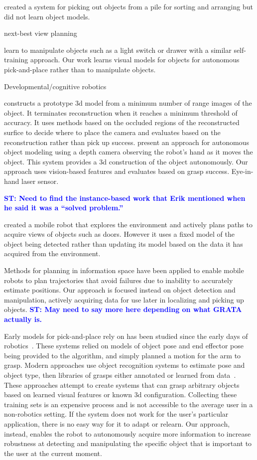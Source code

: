 \documentclass{article}
\newcommand{\stnote}[1]{\textcolor{blue}{\textbf{ST: #1}}}
\begin{document}
\citet{chang12} created a system for picking out objects from a pile
for sorting and arranging but did not learn object models.  

next-best view planning~\citep{kriegel11}

\citet{nguyen14} learn to manipulate objects such as a light switch or
drawer with a similar self-training approach.  Our work learns visual
models for objects for autonomous pick-and-place rather than to
manipulate objects.

Developmental/cognitive robotics~\citep{lyubova13, kraft10r}

\citet{banta00} constructs a prototype 3d model from a minimum number
of range images of the object.  It terminates reconstruction when it
reaches a minimum threshold of accuracy.  It uses methods based on the
occluded regions of the reconstructed surfice to decide where to place
the camera and evaluates based on the reconstruction rather than pick
up success.  \citet{krainin11} present an approach for autonomous
object modeling using a depth camera observing the robot's hand as it
moves the object.  This system provides a 3d construction of the
object autonomously.  Our approach uses vision-based features and
evaluates based on grasp success.  Eye-in-hand laser
sensor.~\citep{aeotti14}

\stnote{Need to find the instance-based work that Erik mentioned when
  he said it was a ``solved problem.''}

\citet{velez11} created a mobile robot that explores the environment
and actively plans paths to acquire views of objects such as doors.
However it uses a fixed model of the object being detected rather than
updating its model based on the data it has acquired from the
environment.

Methods for planning in information space \citep{he08, atanasov13,
  prentice09} have been applied to enable mobile robots to plan
trajectories that avoid failures due to inability to accurately
estimate positions.  Our approach is focused instead on
object detection and manipulation, actively acquiring data for use
later in localizing and picking up objects. \stnote{May need to say
  more here depending on what GRATA actually is.}


Early models for pick-and-place rely on has been studied since the
early days of robotics~\citep{brooks83, lozano89}.  These systems
relied on models of object pose and end effector pose being provided to the
algorithm, and simply planned a motion for the arm to grasp.  Modern
approaches use object recognition systems to estimate pose and object
type, then libraries of grasps either annotated or learned from
data~\citep{saxena08, goldfeder09, morales03}.  These approaches
attempt to create systems that can grasp arbitrary objects based on
learned visual features or known 3d configuration.  Collecting these
training sets is an expensive process and is not accessible to the
average user in a non-robotics setting.  If the system does not work
for the user's particular application, there is no easy way for it to
adapt or relearn.  Our approach, instead, enables the robot to
autonomously acquire more information to increase robustness at
detecting and manipulating the specific object that is important to
the user at the current moment.
\end{document}
